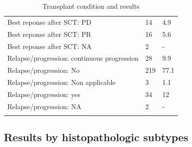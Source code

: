 \documentclass[a4paper,11pt] {article}
\begin{document}
\begin{longtable}{lll}
  Best reponse after SCT: PD & 14 & 4.9 \\ 
  Best reponse after SCT: PR & 16 & 5.6 \\ 
  Best reponse after SCT: NA & 2 & - \\ 
  Relapse/progression: continuous progression & 28 & 9.9 \\ 
  Relapse/progression: No & 219 & 77.1 \\ 
  Relapse/progression: Non applicable  & 3 & 1.1 \\ 
  Relapse/progression: yes & 34 & 12 \\ 
  Relapse/progression: NA & 2 & - \\ 
   \hline
\hline
\caption{Transplant condition and results} 
\label{tab:condi}
\end{longtable}\pagebreak[4]
\begin{landscape}

\subsection{Results by histopathologic subtypes }


\end{landscape}
\end{document}
